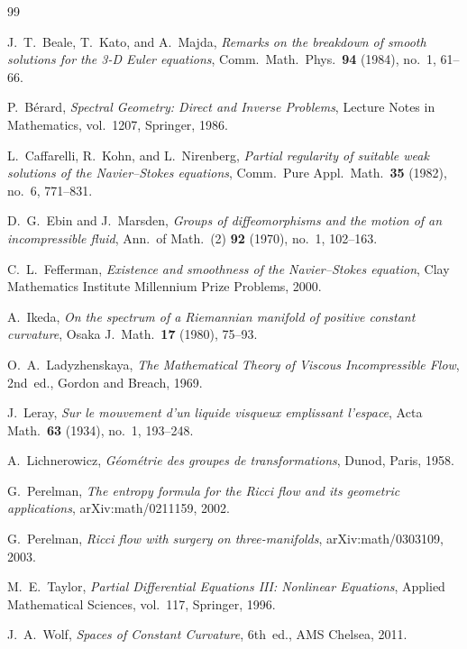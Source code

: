 \documentclass[11pt,a4paper]{article}
\theoremstyle{plain}
\theoremstyle{definition}
\begin{document}
\begin{thebibliography}{99}

J.~T.~Beale, T.~Kato, and A.~Majda,
\emph{Remarks on the breakdown of smooth solutions for the 3-D Euler
equations},
Comm.\ Math.\ Phys.\ \textbf{94} (1984), no.~1, 61--66.

P.~B\'{e}rard,
\emph{Spectral Geometry: Direct and Inverse Problems},
Lecture Notes in Mathematics, vol.~1207, Springer, 1986.

L.~Caffarelli, R.~Kohn, and L.~Nirenberg,
\emph{Partial regularity of suitable weak solutions of the Navier--Stokes
equations},
Comm.\ Pure Appl.\ Math.\ \textbf{35} (1982), no.~6, 771--831.

D.~G.~Ebin and J.~Marsden,
\emph{Groups of diffeomorphisms and the motion of an incompressible fluid},
Ann.\ of Math.\ (2) \textbf{92} (1970), no.~1, 102--163.

C.~L.~Fefferman,
\emph{Existence and smoothness of the Navier--Stokes equation},
Clay Mathematics Institute Millennium Prize Problems, 2000.

A.~Ikeda,
\emph{On the spectrum of a Riemannian manifold of positive constant
curvature},
Osaka J.\ Math.\ \textbf{17} (1980), 75--93.

O.~A.~Ladyzhenskaya,
\emph{The Mathematical Theory of Viscous Incompressible Flow},
2nd~ed., Gordon and Breach, 1969.

J.~Leray,
\emph{Sur le mouvement d'un liquide visqueux emplissant l'espace},
Acta Math.\ \textbf{63} (1934), no.~1, 193--248.

A.~Lichnerowicz,
\emph{G\'{e}om\'{e}trie des groupes de transformations},
Dunod, Paris, 1958.

G.~Perelman,
\emph{The entropy formula for the Ricci flow and its geometric applications},
arXiv:math/0211159, 2002.

G.~Perelman,
\emph{Ricci flow with surgery on three-manifolds},
arXiv:math/0303109, 2003.

M.~E.~Taylor,
\emph{Partial Differential Equations III: Nonlinear Equations},
Applied Mathematical Sciences, vol.~117, Springer, 1996.

J.~A.~Wolf,
\emph{Spaces of Constant Curvature},
6th~ed., AMS Chelsea, 2011.

\end{thebibliography}
\end{document}

